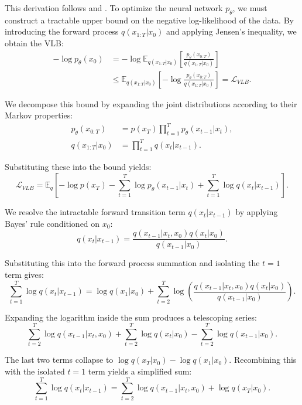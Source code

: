 This derivation follows \textcite{sohl2015thermo} and \textcite{ho_denoising_2020}. To optimize the neural network $p_\theta$, we must construct a tractable upper bound on the negative log-likelihood of the data. By introducing the forward process $q(x_{1:T}|x_0)$ and applying Jensen's inequality, we obtain the VLB:
\begin{align}
    -\log p_\theta(x_0) &= -\log \mathbb{E}_{q(x_{1:T}|x_0)} \left[ \frac{p_\theta(x_{0:T})}{q(x_{1:T}|x_0)} \right] \nonumber \\
    &\le \mathbb{E}_{q(x_{1:T}|x_0)} \left[ -\log \frac{p_\theta(x_{0:T})}{q(x_{1:T}|x_0)} \right] = \mathcal{L}_{VLB}.
\end{align}

We decompose this bound by expanding the joint distributions according to their Markov properties:
\begin{align}
    p_\theta(x_{0:T}) &= p(x_T) \prod_{t=1}^T p_\theta(x_{t-1}|x_t), \\
    q(x_{1:T}|x_0) &= \prod_{t=1}^T q(x_t|x_{t-1}).
\end{align}

Substituting these into the bound yields:
\begin{equation}
    \mathcal{L}_{VLB} = \mathbb{E}_q \left[ -\log p(x_T) - \sum_{t=1}^T \log p_\theta(x_{t-1}|x_t) + \sum_{t=1}^T \log q(x_t|x_{t-1}) \right].
\end{equation}

We resolve the intractable forward transition term $q(x_t|x_{t-1})$ by applying Bayes' rule conditioned on $x_0$:
\begin{equation}
    q(x_t|x_{t-1}) = \frac{q(x_{t-1}|x_t, x_0) q(x_t|x_0)}{q(x_{t-1}|x_0)}.
\end{equation}

Substituting this into the forward process summation and isolating the $t=1$ term gives:
\begin{equation}
    \sum_{t=1}^T \log q(x_t|x_{t-1}) = \log q(x_1|x_0) + \sum_{t=2}^T \log \left( \frac{q(x_{t-1}|x_t, x_0) q(x_t|x_0)}{q(x_{t-1}|x_0)} \right).
\end{equation}

Expanding the logarithm inside the sum produces a telescoping series:
\begin{equation}
    \sum_{t=2}^T \log q(x_{t-1}|x_t, x_0) + \sum_{t=2}^T \log q(x_t|x_0) - \sum_{t=2}^T \log q(x_{t-1}|x_0).
\end{equation}

The last two terms collapse to $\log q(x_T|x_0) - \log q(x_1|x_0)$. Recombining this with the isolated $t=1$ term yields a simplified sum:
\begin{equation}
    \sum_{t=1}^T \log q(x_t|x_{t-1}) = \sum_{t=2}^T \log q(x_{t-1}|x_t, x_0) + \log q(x_T|x_0).
\end{equation}

